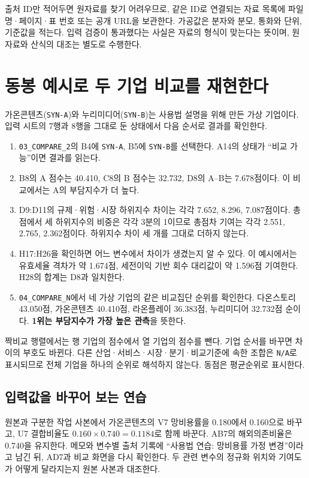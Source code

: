 출처 ID만 적어두면 원자료를 찾기 어려우므로, 같은 ID로 연결되는 자료 목록에 파일명·페이지·표 번호 또는 공개 URL을 보관한다. 가공값은 분자와 분모, 통화와 단위, 기준값을 적는다. 입력 검증이 통과했다는 사실은 자료의 형식이 맞는다는 뜻이며, 원자료와 산식의 대조는 별도로 수행한다.

\section{동봉 예시로 두 기업 비교를 재현한다}

가온콘텐츠(\texttt{SYN-A})와 누리미디어(\texttt{SYN-B})는 사용법 설명을 위해 만든 가상 기업이다. 입력 시트의 7행과 8행을 그대로 둔 상태에서 다음 순서로 결과를 확인한다.

\begin{enumerate}[leftmargin=1.8em,itemsep=0.45em]
\item \nolinkurl{03_COMPARE_2}의 B4에 \texttt{SYN-A}, B5에 \texttt{SYN-B}를 선택한다. A14의 상태가 ``비교 가능''이면 결과를 읽는다.
\item B8의 A 점수는 40.410, C8의 B 점수는 32.732, D8의 A--B는 7.678점이다. 이 비교에서는 A의 부담지수가 더 높다.
\item D9:D11의 규제·위험·시장 하위지수 차이는 각각 7.652, 8.296, 7.087점이다. 총점에서 세 하위지수의 비중은 각각 3분의 1이므로 총점차 기여는 각각 2.551, 2.765, 2.362점이다. 하위지수 차이 세 개를 그대로 더하지 않는다.
\item H17:H26을 확인하면 어느 변수에서 차이가 생겼는지 알 수 있다. 이 예시에서는 유효세율 격차가 약 1.674점, 세전이익 기반 회수 대리값이 약 1.596점 기여한다. H28의 합계는 D8과 일치한다.
\item \nolinkurl{04_COMPARE_N}에서 네 가상 기업의 같은 비교집단 순위를 확인한다. 다온스토리 43.050점, 가온콘텐츠 40.410점, 라온플레이 36.383점, 누리미디어 32.732점 순이다. \textbf{1위는 부담지수가 가장 높은 관측}을 뜻한다.
\end{enumerate}

짝비교 행렬에서는 행 기업의 점수에서 열 기업의 점수를 뺀다. 기업 순서를 바꾸면 차이의 부호도 바뀐다. 다른 산업·서비스·시장·분기·비교기준에 속한 조합은 \texttt{N/A}로 표시되므로 전체 기업을 하나의 순위로 해석하지 않는다. 동점은 평균순위로 표시한다.

\subsection{입력값을 바꾸어 보는 연습}

원본과 구분한 작업 사본에서 가온콘텐츠의 V7 망비용률을 0.180에서 0.160으로 바꾸고, U7 결합비율도 \(0.160\times0.740=0.1184\)로 함께 바꾼다. AB7의 해외의존비율은 0.740을 유지한다. 메모와 변수별 출처 기록에 ``사용법 연습: 망비용률 가정 변경''이라고 남긴 뒤, AD7과 비교 화면을 다시 확인한다. 두 관련 변수의 정규화 위치와 기여도가 어떻게 달라지는지 원본 사본과 대조한다.

